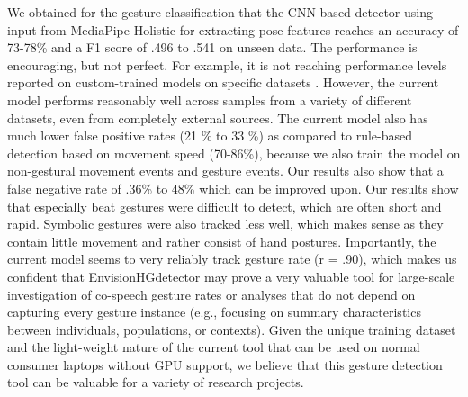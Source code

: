\documentclass[11pt,headings=small,cleardoublepage=empty,tocflat,numbers=noenddot,twoside,captions=tableheading]{scrbook}
\begin{document}
\begin{refsection}
\begin{table}[H]
\begin{table}[H]
\begin{table}[H]
\begin{table}[H]
We obtained for the gesture classification that the CNN-based detector using input from MediaPipe Holistic for extracting pose features reaches an accuracy of 73-78\% and a F1 score of .496 to .541 on unseen data. The performance is encouraging, but not perfect. For example, it is not reaching performance levels reported on custom-trained models on specific datasets \parencite{ienagaSemiautomationGestureAnnotation2022, ghalebCoSpeechGestureDetection2024}. However, the current model performs reasonably well across samples from a variety of different datasets, even from completely external sources. The current model also has much lower false positive rates (21 \% to 33 \%) as compared to rule-based detection based on movement speed \parencite{pouwSemanticallyRelatedGestures2021, ripperdaSpeedingDetectionNoniconic2020} (70-86\%), because we also train the model on non-gestural movement events and gesture events. Our results also show that a false negative rate of .36\% to 48\% which can be improved upon. Our results show that especially beat gestures were difficult to detect, which are often short and rapid. Symbolic gestures were also tracked less well, which makes sense as they contain little movement and rather consist of hand postures. Importantly, the current model seems to very reliably track gesture rate (r = .90), which makes us confident that EnvisionHGdetector may prove a very valuable tool for large-scale investigation of co-speech gesture rates or analyses that do not depend on capturing every gesture instance (e.g., focusing on summary characteristics between individuals, populations, or contexts). Given the unique training dataset and the light-weight nature of the current tool that can be used on normal consumer laptops without GPU support, we believe that this gesture detection tool can be valuable for a variety of research projects. 


\end{table}
\end{table}
\end{table}
\end{table}
\end{refsection}
\end{document}
